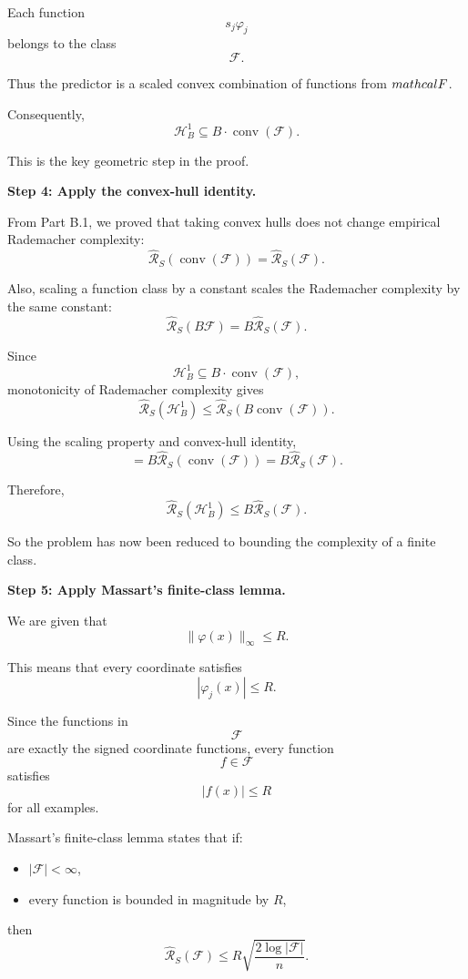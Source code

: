 \documentclass[11pt]{article}
\begin{document}
\begin{enumerate}
\begin{solutionbox}
Each function
\[
s_j\varphi_j
\]
belongs to the class
\[
\mathcal F.
\]

Thus the predictor is a scaled convex combination of functions from $\\mathcal F$.

Consequently,
\[
\boxed{
\mathcal H_B^1
\subseteq
B\cdot\operatorname{conv}(\mathcal F).
}
\]

This is the key geometric step in the proof.

\medskip

\textbf{Step 4: Apply the convex-hull identity.}

From Part B.1, we proved that taking convex hulls does not change empirical Rademacher complexity:
\[
\widehat{\mathcal R}_S(\operatorname{conv}(\mathcal F))
=
\widehat{\mathcal R}_S(\mathcal F).
\]

Also, scaling a function class by a constant scales the Rademacher complexity by the same constant:
\[
\widehat{\mathcal R}_S(B\mathcal F)
=
B\widehat{\mathcal R}_S(\mathcal F).
\]

Since
\[
\mathcal H_B^1
\subseteq
B\cdot\operatorname{conv}(\mathcal F),
\]
monotonicity of Rademacher complexity gives
\[
\widehat{\mathcal R}_S(\mathcal H_B^1)
\le
\widehat{\mathcal R}_S(B\operatorname{conv}(\mathcal F)).
\]

Using the scaling property and convex-hull identity,
\[
=
B
\widehat{\mathcal R}_S(\operatorname{conv}(\mathcal F))
=
B
\widehat{\mathcal R}_S(\mathcal F).
\]

Therefore,
\[
\boxed{
\widehat{\mathcal R}_S(\mathcal H_B^1)
\le
B\widehat{\mathcal R}_S(\mathcal F).
}
\]

So the problem has now been reduced to bounding the complexity of a finite class.

\medskip

\textbf{Step 5: Apply Massart's finite-class lemma.}

We are given that
\[
\|\varphi(x)\|_\infty\le R.
\]

This means that every coordinate satisfies
\[
|\varphi_j(x)|\le R.
\]

Since the functions in
\[
\mathcal F
\]
are exactly the signed coordinate functions,
every function
\[
f\in\mathcal F
\]
satisfies
\[
|f(x)|\le R
\]
for all examples.

Massart's finite-class lemma states that if:
\begin{itemize}
    \item $|\mathcal F|<\infty$,
    \item every function is bounded in magnitude by $R$,
\end{itemize}
then
\[
\widehat{\mathcal R}_S(\mathcal F)
\le
R
\sqrt{
\frac{2\log|\mathcal F|}{n}
}.
\]


\end{solutionbox}
\end{enumerate}
\end{document}
